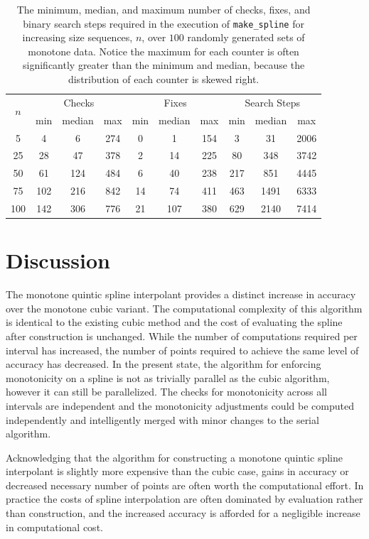 \documentclass{scspaperproc}
\theoremstyle{scsthe}
\begin{document}
\begin{table}
  \centering
  \caption{The minimum, median, and maximum number of checks, fixes, and binary search steps required in the execution of \texttt{make\_spline} for increasing size sequences, $n$, over $100$ randomly generated sets of monotone data. Notice the maximum for each counter is often significantly greater than the minimum and median, because the distribution of each counter is skewed right.}
  \label{table:e3_results}
  \begin{tabular}{c|c c c|c c c|c c c}
    \hline
    \multirow{2}{*}{$n$}
      & \multicolumn{3}{c|}{Checks} & \multicolumn{3}{c}{Fixes} & \multicolumn{3}{|c}{Search Steps} \\
      & min & median & max & min & median & max & min & median & max \\
    \hline
    5 & 4 & 6 & 274 & 0 & 1 & 154 & 3 & 31 & 2006\\
    25 & 28 & 47 & 378 & 2 & 14 & 225 & 80 & 348 & 3742\\
    50 & 61 & 124 & 484 & 6 & 40 & 238 & 217 & 851 & 4445\\
    75 & 102 & 216 & 842 & 14 & 74 & 411 & 463 & 1491 & 6333\\
    100 & 142 & 306 & 776 & 21 & 107 & 380 & 629 & 2140 & 7414\\
    \hline
  \end{tabular}
\end{table}

\section{Discussion}
\label{sec:discussion}

The monotone quintic spline interpolant provides a distinct increase in accuracy over the monotone cubic variant. The computational complexity of this algorithm is identical to the existing cubic method and the cost of evaluating the spline after construction is unchanged. While the number of computations required per interval has increased, the number of points required to achieve the same level of accuracy has decreased. In the present state, the algorithm for enforcing monotonicity on a spline is not as trivially parallel as the cubic algorithm, however it can still be parallelized. The checks for monotonicity across all intervals are independent and the monotonicity adjustments could be computed independently and intelligently merged with minor changes to the serial algorithm.

Acknowledging that the algorithm for constructing a monotone quintic spline interpolant is slightly more expensive than the cubic case, gains in accuracy or decreased necessary number of points are often worth the computational effort. In practice the costs of spline interpolation are often dominated by evaluation rather than construction, and the increased accuracy is afforded for a negligible increase in computational cost.
\end{document}
